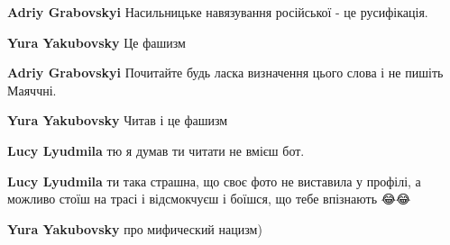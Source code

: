 \begin{itemize}
\begin{itemize}
\textbf{Adriy Grabovskyi} Насильницьке навязування російської - це русифікація.

 
\textbf{Yura Yakubovsky} Це фашизм

 
\textbf{Adriy Grabovskyi} Почитайте будь ласка визначення цього слова і не пишіть Маяччні.

 
\textbf{Yura Yakubovsky} Читав і це фашизм

 
\textbf{Lucy Lyudmila} тю я думав ти читати не вмієш бот.

 
\textbf{Lucy Lyudmila} ти така страшна, що своє фото не виставила у профілі, а
можливо стоїш на трасі і відсмокчуєш і боїшся, що тебе впізнають 😂😂

 
\textbf{Yura Yakubovsky} про мифический нацизм)


\end{itemize}
\end{itemize}
